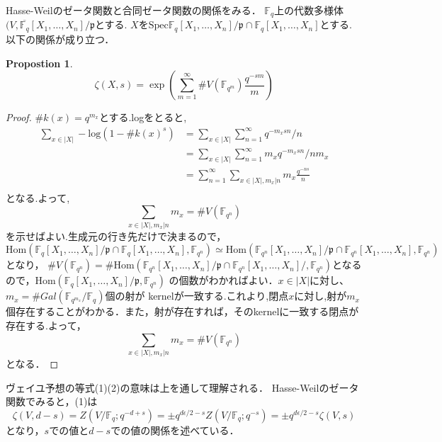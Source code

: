 \documentclass{ujarticle}
\newtheorem{prop}[thm]{Propostion}
\begin{document}
Hasse-Weilのゼータ関数と合同ゼータ関数の関係をみる．
$\mathbb{F}_q$上の代数多様体$(V, \overline{\mathbb{F}_q}[X_1,\dots,X_n]/\mathfrak{p}$とする.
$X$を$\mathrm{Spec}\mathbb{F}_q[X_1,\dots,X_n]/\mathfrak{p}\cap \mathbb{F}_q[X_1,\dots,X_n]$とする.
以下の関係が成り立つ．
\begin{prop}
  \begin{equation*}
   \zeta(X,s)=\exp(\sum_{m=1}^{\infty}\#V(\mathbb{F}_{q^m}) \frac{q^{-sm}}{m})
  \end{equation*}
\end{prop}
\begin{proof}
  $\#k(x)=q^{m_x}$とする.logをとると,
  \begin{align*}
    \sum_{x \in |X|} -\mathrm{log}(1-\#k(x)^s) &=
    \sum_{x \in |X|}\sum_{n=1}^{\infty} q^{-m_xsn}/n \\
    & = \sum_{x \in |X|}\sum_{n=1}^{\infty} m_xq^{-m_xsn}/nm_x \\
    & = \sum_{n=1}^{\infty}\sum_{x\in |X|, m_x|n}m_x \frac{q^{-ns}}{n} \\
  \end{align*}
  となる.よって,
  \begin{equation*}
   \sum_{x\in |X|, m_x|n}m_x = \#V(\mathbb{F}_{q^n})
  \end{equation*}
  を示せばよい.生成元の行き先だけで決まるので，$\mathrm{Hom}(\mathbb{F}_q[X_1,\dots,X_n]/\mathfrak{p} \cap \mathbb{F}_q[X_1,\dots,X_n],\mathbb{F}_{q^n})
  \simeq \mathrm{Hom}(\mathbb{F}_{q^n}[X_1,\dots,X_n]/\mathfrak{p}\cap\mathbb{F}_{q^n}[X_1,\dots,X_n],\mathbb{F}_{q^n})$
  となり， $\#V(\mathbb{F}_{q^n})=\#\mathrm{Hom}(\mathbb{F}_{q^n}[X_1,\dots,X_n]/\mathfrak{p}\cap \mathbb{F}_{q^n}[X_1,\dots,X_n]/,\mathbb{F}_{q^n})$となるので，$\mathrm{Hom}(\mathbb{F}_q[X_1,\dots,X_n]/\mathfrak{p},\mathbb{F}_{q^n})$
  の個数がわかればよい．$x \in |X|$に対し、$m_x=\#Gal(\mathbb{F}_{q^{m_x}}/\mathbb{F}_q)$個の射が
  kernelが一致する.これより,閉点$x$に対し,射が$m_x$個存在することがわかる．また，射が存在すれば，そのkernelに一致する閉点が存在する.よって，
  \begin{equation*}
   \sum_{x\in |X|, m_x|n}m_x = \#V(\mathbb{F}_{q^n})
  \end{equation*}
  となる．
\end{proof}
ヴェイユ予想の等式(1)(2)の意味は上を通して理解される．
Hasse-Weilのゼータ関数でみると，(1)は
\begin{equation*}
 \zeta(V,d-s)=Z(V/\mathbb{F}_q;q^{-d+s})=\pm q^{d \epsilon/2 -s}Z(V/\mathbb{F}_q;q^{-s})
 = \pm q^{d \epsilon/2 -s} \zeta(V,s)
\end{equation*}
となり，$s$での値と$d-s$での値の関係を述べている．
\end{document}
